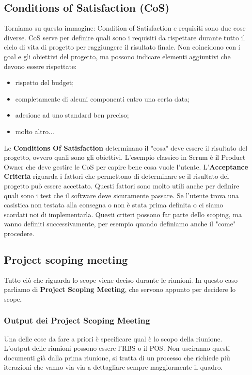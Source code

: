 \subsection{Conditions of Satisfaction (CoS)}
Torniamo su questa immagine:
\noindent Condition of Satisfaction e requisiti sono due cose diverse. CoS serve per definire quali sono i requisiti da rispettare durante tutto il ciclo di vita di progetto per raggiungere il risultato finale. Non coincidono con i goal e gli obiettivi del progetto, ma possono indicare elementi aggiuntivi che devono essere rispettate:
\begin{itemize}
	\item rispetto del budget;
	\item completamente di alcuni componenti entro una certa data;
	\item adesione ad uno standard ben preciso;
	\item molto altro...
\end{itemize}
Le \textbf{Conditions Of Satisfaction} determinano il "cosa" deve essere il risultato del progetto, ovvero quali sono gli obiettivi. L'esempio classico in Scrum è il Product Owner che deve gestire le CoS per capire bene cosa vuole l'utente.
L'\textbf{Acceptance Criteria} riguarda i fattori che permettono di determinare se il risultato del progetto può essere accettato. Questi fattori sono molto utili anche per definire quali sono i test che il software deve sicuramente passare. Se l'utente trova una casistica non testata alla consegna o non è stata prima definita o ci siamo scordati noi di implementarla. Questi criteri possono far parte dello scoping, ma vanno definiti successivamente, per esempio quando definiamo anche il "come" procedere.
\subsection{Project scoping meeting}
Tutto ciò che riguarda lo scope viene deciso durante le riunioni. In questo caso parliamo di \textbf{Project Scoping Meeting}, che servono appunto per decidere lo scope.
\subsubsection{Output dei Project Scoping Meeting}
Una delle cose da fare a priori è specificare qual è lo scopo della riunione. L'output delle riunioni possono essere l'RBS o il POS. Non usciranno questi documenti già dalla prima riunione, si tratta di un processo che richiede più iterazioni che vanno via via a dettagliare sempre maggiormente il quadro.
